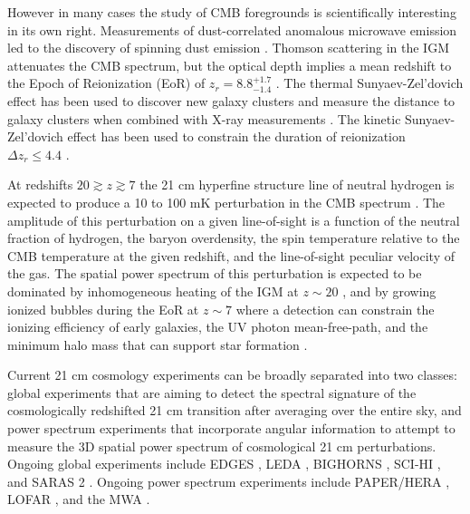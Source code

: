 \documentclass[twocolumn]{aastex61}
\begin{document}
However in many cases the study of CMB foregrounds is scientifically interesting in its own right.
Measurements of dust-correlated anomalous microwave emission \citep{1997ApJ...486L..23L} led to the
discovery of spinning dust emission \citep{1998ApJ...508..157D}. Thomson scattering in the IGM
attenuates the CMB spectrum, but the optical depth implies a mean redshift to the Epoch of
Reionization (EoR) of $z_r = 8.8^{+1.7}_{-1.4}$ \citep{2016A&A...594A..13P}.  The thermal
Sunyaev-Zel'dovich effect \citep{1970CoASP...2...66S, 1972CoASP...4..173S} has been used to discover
new galaxy clusters \citep{2010ApJ...722.1180V} and measure the distance to galaxy clusters when
combined with X-ray measurements \citep{2006ApJ...647...25B}. The kinetic Sunyaev-Zel'dovich effect
has been used to constrain the duration of reionization $\Delta z_r \le 4.4$
\citep{2012ApJ...756...65Z}.

At redshifts $20 \gtrsim z \gtrsim 7$ the 21 cm hyperfine structure line of neutral hydrogen is
expected to produce a 10 to 100 mK perturbation in the CMB spectrum \citep{2006PhR...433..181F,
2012RPPh...75h6901P}. The amplitude of this perturbation on a given line-of-sight is a function of
the neutral fraction of hydrogen, the baryon overdensity, the spin temperature relative to the CMB
temperature at the given redshift, and the line-of-sight peculiar velocity of the gas.  The spatial
power spectrum of this perturbation is expected to be dominated by inhomogeneous heating of the IGM
at $z\sim 20$ \citep{2014MNRAS.437L..36F}, and by growing ionized bubbles during the EoR at $z\sim
7$ where a detection can constrain the ionizing efficiency of early galaxies, the UV photon
mean-free-path, and the minimum halo mass that can support star formation
\citep{2015MNRAS.449.4246G}.

Current 21 cm cosmology experiments can be broadly separated into two classes: global experiments
that are aiming to detect the spectral signature of the cosmologically redshifted 21 cm transition
after averaging over the entire sky, and power spectrum experiments that incorporate angular
information to attempt to measure the 3D spatial power spectrum of cosmological 21 cm perturbations.
Ongoing global experiments include EDGES \citep{2010Natur.468..796B, 2017ApJ...835...49M}, LEDA
\citep{todo_price_2017}, BIGHORNS \citep{2015PASA...32....4S}, SCI-HI \citep{2014ApJ...782L...9V},
and SARAS 2 \citep{2017arXiv170306647S}.  Ongoing power spectrum experiments include PAPER/HERA
\citep{2015ApJ...809...61A, 2016arXiv160607473D}, LOFAR \citep{2017ApJ...838...65P}, and the MWA
\citep{2016ApJ...833..102B}.
\end{document}
